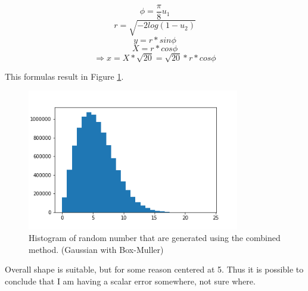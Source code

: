 \documentclass{article}
\begin{document}
\begin{equation}
	\phi = \frac{\pi}{8}u_1
\end{equation}
\begin{equation}
	r=\sqrt{-2 log(1-u_2)}
\end{equation}
\begin{equation}
	y=r*sin\phi
\end{equation}
\begin{equation}
	X=r*cos\phi
\end{equation}
\begin{equation}
	\Longrightarrow x=X*\sqrt{20}=\sqrt{20}*r* cos\phi
\end{equation}

This formulas result in Figure \ref{fig:ex4histComb}.
\begin{figure}[!hbt]
	\includegraphics[width=350px]{"../Laskari2/ex4histComb"}
	\caption{Histogram of random number that are generated using the combined method. (Gaussian with Box-Muller)}
	\label{fig:ex4histComb}
\end{figure}
Overall shape is suitable, but for some reason centered at 5. Thus it is possible to conclude that I am having a scalar error somewhere, not sure where.
\end{document}
